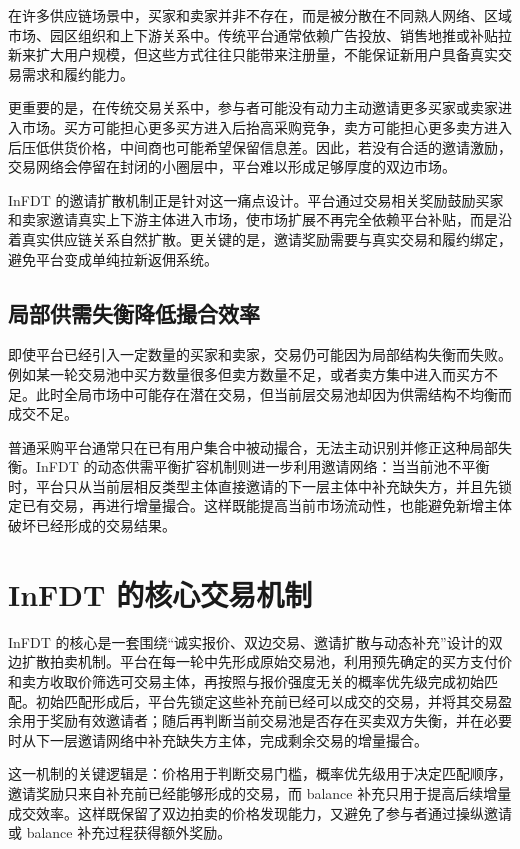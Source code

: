 \documentclass[UTF8,11pt]{ctexart}
\begin{document}
在许多供应链场景中，买家和卖家并非不存在，而是被分散在不同熟人网络、区域市场、园区组织和上下游关系中。传统平台通常依赖广告投放、销售地推或补贴拉新来扩大用户规模，但这些方式往往只能带来注册量，不能保证新用户具备真实交易需求和履约能力。

更重要的是，在传统交易关系中，参与者可能没有动力主动邀请更多买家或卖家进入市场。买方可能担心更多买方进入后抬高采购竞争，卖方可能担心更多卖方进入后压低供货价格，中间商也可能希望保留信息差。因此，若没有合适的邀请激励，交易网络会停留在封闭的小圈层中，平台难以形成足够厚度的双边市场。

InFDT 的邀请扩散机制正是针对这一痛点设计。平台通过交易相关奖励鼓励买家和卖家邀请真实上下游主体进入市场，使市场扩展不再完全依赖平台补贴，而是沿着真实供应链关系自然扩散。更关键的是，邀请奖励需要与真实交易和履约绑定，避免平台变成单纯拉新返佣系统。

\subsection{局部供需失衡降低撮合效率}

即使平台已经引入一定数量的买家和卖家，交易仍可能因为局部结构失衡而失败。例如某一轮交易池中买方数量很多但卖方数量不足，或者卖方集中进入而买方不足。此时全局市场中可能存在潜在交易，但当前层交易池却因为供需结构不均衡而成交不足。

普通采购平台通常只在已有用户集合中被动撮合，无法主动识别并修正这种局部失衡。InFDT 的动态供需平衡扩容机制则进一步利用邀请网络：当当前池不平衡时，平台只从当前层相反类型主体直接邀请的下一层主体中补充缺失方，并且先锁定已有交易，再进行增量撮合。这样既能提高当前市场流动性，也能避免新增主体破坏已经形成的交易结果。

\newpage

\section{InFDT 的核心交易机制}

InFDT 的核心是一套围绕“诚实报价、双边交易、邀请扩散与动态补充”设计的双边扩散拍卖机制。平台在每一轮中先形成原始交易池，利用预先确定的买方支付价和卖方收取价筛选可交易主体，再按照与报价强度无关的概率优先级完成初始匹配。初始匹配形成后，平台先锁定这些补充前已经可以成交的交易，并将其交易盈余用于奖励有效邀请者；随后再判断当前交易池是否存在买卖双方失衡，并在必要时从下一层邀请网络中补充缺失方主体，完成剩余交易的增量撮合。

这一机制的关键逻辑是：价格用于判断交易门槛，概率优先级用于决定匹配顺序，邀请奖励只来自补充前已经能够形成的交易，而 balance 补充只用于提高后续增量成交效率。这样既保留了双边拍卖的价格发现能力，又避免了参与者通过操纵邀请或 balance 补充过程获得额外奖励。
\end{document}
